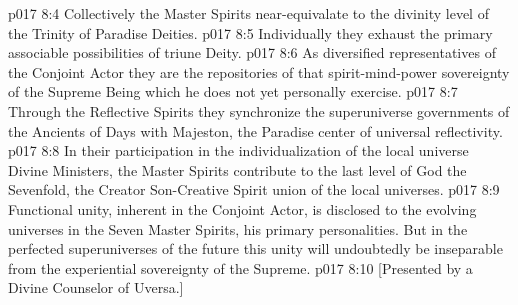 \pc \vs p017 8:4 \bibnobreakspace Collectively the Master Spirits near\hyp{}equivalate to the divinity level of the Trinity of Paradise Deities.
\vs p017 8:5 \bibnobreakspace Individually they exhaust the primary associable possibilities of triune Deity.
\vs p017 8:6 \bibnobreakspace As diversified representatives of the Conjoint Actor they are the repositories of that spirit\hyp{}mind\hyp{}power sovereignty of the Supreme Being which he does not yet personally exercise.
\vs p017 8:7 \bibnobreakspace Through the Reflective Spirits they synchronize the superuniverse governments of the Ancients of Days with Majeston, the Paradise center of universal reflectivity.
\vs p017 8:8 \bibnobreakspace In their participation in the individualization of the local universe Divine Ministers, the Master Spirits contribute to the last level of God the Sevenfold, the Creator Son\hyp{}Creative Spirit union of the local universes.\plusone
\pc \vs p017 8:9 Functional unity, inherent in the Conjoint Actor, is disclosed to the evolving universes in the Seven Master Spirits, his primary personalities. But in the perfected superuniverses of the future this unity will undoubtedly be inseparable from the experiential sovereignty of the Supreme.
\vsetoff
\vs p017 8:10 [Presented by a Divine Counselor of Uversa.]
